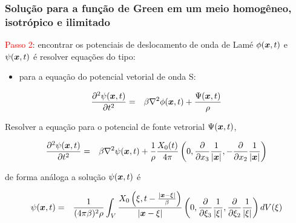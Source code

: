 \documentclass{beamer}
\newcommand{\xvec}{\vc{x}}
\newcommand{\xivec}{\boldmath \xi}
\begin{document}
\begin{frame}
	\frametitle{\textbf{Solu\c{c}\~ao para a fun\c{c}\~ao de Green em um meio homog\^eneo, isotr\'opico e ilimitado}}
	\begin{flushleft}
		\textcolor{red}{Passo 2}:\hspace{0.025cm} encontrar os potenciais de deslocamento de onda de Lam\'e $\phi(\xvec,t)$ e $\psi(\xvec,t)$ \'e resolver equa\c{c}\~oes do tipo:\\ 
	\end{flushleft}
	\begin{itemize}
		\item para a equa\c{c}\~ao do potencial vetorial de onda S: 
	\end{itemize} 
	\begin{eqnarray}
	\label{ten1}
	\frac{\partial^2 \psi(\xvec,t)}{\partial t^2} &=& \beta \nabla^2 \phi(\xvec,t) + \frac{\Psi(\xvec,t)}{\rho} \,        
	\end{eqnarray}
	\begin{flushleft}
		Resolver a equa\c{c}\~ao para o potencial de fonte vetrorial $\Psi(\xvec,t)$,
	\end{flushleft}
	\begin{eqnarray}
	\label{ten1}
	\frac{\partial^2 \psi(\xvec,t)}{\partial t^2} &=& \beta \nabla^2 \psi(\xvec,t) + \frac{1}{\rho}\frac{X_{0}(t)}{4\pi}\left(0, \frac{\partial }{\partial x_3}  \frac{1}{\left| \xvec \right|},-\frac{\partial }{\partial x_2} \frac{1}{\left| \xvec \right|}  \right) \, 
	\end{eqnarray}
	\begin{flushleft}
		de forma an\'aloga a solu\c{c}\~ao $\psi(\xvec,t)$ \'e
	\end{flushleft}
	\begin{eqnarray}
	\label{ten1}
	\psi(\xvec,t) &=& \frac{1}{(4\pi\beta)^{2} \rho} \int_{V} \frac{ X_{0} \left( \xivec,t - \frac{\left|\xvec - \xivec \right|}{\beta}  \right) }{\left|\xvec - \xivec \right|}  \left(0, \frac{\partial }{\partial \xi_3} \frac{1}{\left| \xivec \right|}, \frac{\partial }{\partial \xi_2} \frac{1}{\left| \xivec \right|} \right) dV(\xivec) \, \nonumber \\
	\end{eqnarray}
	
\end{frame}%
\end{document}
